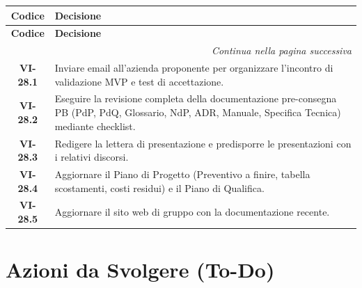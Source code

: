 \noindent

\begin{longtable}{c p{12cm}}

\toprule

\textbf{Codice} & \textbf{Decisione} \\

\midrule

\endfirsthead


\toprule

\textbf{Codice} & \textbf{Decisione} \\

\midrule

\endhead


\midrule

\multicolumn{2}{r}{\textit{Continua nella pagina successiva}} \\

\midrule

\endfoot


\bottomrule

\endlastfoot


\textbf{VI-28.1} & {Inviare email all'azienda proponente per organizzare l'incontro di validazione MVP e test di accettazione.} \\

\textbf{VI-28.2} & {Eseguire la revisione completa della documentazione pre-consegna PB (PdP, PdQ, Glossario, NdP, ADR, Manuale, Specifica Tecnica) mediante checklist.} \\

\textbf{VI-28.3} & {Redigere la lettera di presentazione e predisporre le presentazioni con i relativi discorsi.} \\

\textbf{VI-28.4} & {Aggiornare il Piano di Progetto (Preventivo a finire, tabella scostamenti, costi residui) e il Piano di Qualifica.} \\

\textbf{VI-28.5} & {Aggiornare il sito web di gruppo con la documentazione recente.} \\

\end{longtable}



\section{Azioni da Svolgere (To-Do)}


\renewcommand{\arraystretch}{1.3}

